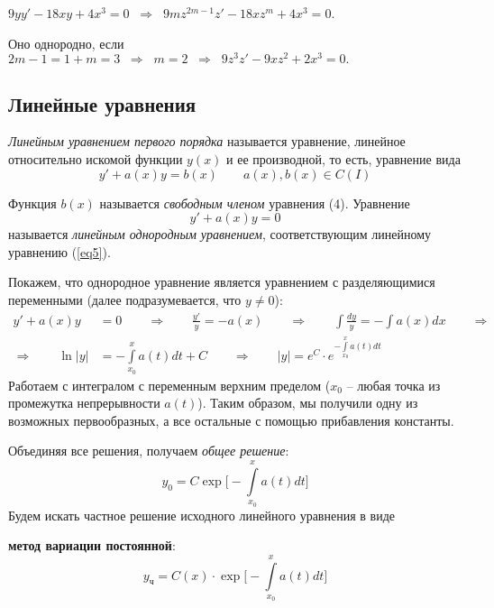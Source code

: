 \Example $9yy' - 18xy + 4x^3 = 0 \;\; \Rightarrow \;\; 9mz^{2m-1}z'-18xz^m+4x^3 = 0$. 

Оно однородно, если $2m-1 = 1+m = 3 \;\; \Rightarrow \;\; m = 2 \;\; \Rightarrow \;\; 9z^3z' - 9xz^2 + 2x^3 = 0.$




\subsection*{Линейные уравнения}

\textit{Линейным уравнением первого порядка} называется уравнение, линейное относительно искомой функции $y(x)$ и ее производной, то есть, уравнение вида
\begin{equation}\label{eq5}
    y' + a(x)y = b(x) \qquad a(x), b(x) \in C(I)
\end{equation}

Функция $b(x)$ называется \textit{свободным членом} уравнения (4). Уравнение 
\begin{equation}\label{eq6}
    y' + a(x)y = 0
\end{equation}
называется \textit{линейным однородным уравнением}, соответствующим линейному уравнению (\ref{eq5}).

Покажем, что однородное уравнение является уравнением с разделяющимися переменными (далее подразумевается, что $y \neq 0$):
\begin{align*}
    y' + a(x)y &= 0 \qquad \Rightarrow \qquad
    \frac{y'}{y} = -a(x) \qquad \Rightarrow \qquad
    \int\frac{dy}{y} = -\int a(x)dx \qquad \Rightarrow\\
    \Rightarrow \qquad \ln|y| &= -\int\limits_{x_0}^xa(t)dt + C \qquad \Rightarrow \qquad
    |y| = e^{C}\cdot e^{-\int\limits_{x_0}^xa(t)dt}
\end{align*}
Работаем с интегралом с переменным верхним пределом ($x_0$ -- любая точка из промежутка непрерывности $a(t)$). Таким образом, мы получили одну из возможных первообразных, а все остальные с помощью прибавления константы.

Объединяя все решения, получаем \textit{общее решение}:
\begin{equation*}
    y_0=C\exp{\Big[-\int\limits_{x_0}^xa(t)dt\Big]}
\end{equation*}
Будем искать частное решение исходного линейного уравнения в виде 

\textbf{метод вариации постоянной}:
\begin{equation*}
    y_{\text{ч}}=C(x)\cdot\exp{\Big[-\int\limits_{x_0}^xa(t)dt\Big]}
\end{equation*}

